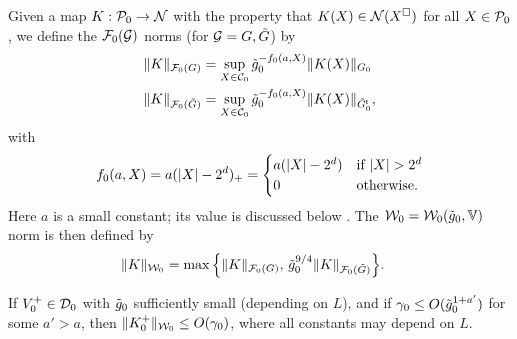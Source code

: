 Given a map $K: \mathcal{P}_0 \rightarrow \mathcal{N}$ with the property that $K(X) \in \mathcal{N}(X^\Box)$
for all $X \in \mathcal{P}_0$,
we define the $\mathcal{F}_0(\mathcal{G})$ norms (for $\mathcal{G} = G, \tilde G$) by
\begin{align}
\|K\|_{\mathcal{F}_0(G)}        &= \sup_{X\in\mathcal{C}_0} \tilde{g}_0^{-f_0(a, X)} \|K(X)\|_{G_0} \\
\|K\|_{\mathcal{F}_0(\tilde G)} &= \sup_{X\in\mathcal{C}_0}
\tilde{g}_0^{-f_0(a, X)} \|K(X)\|_{\tilde G_0^{\sf t}},
\end{align}
with
\begin{equation}
    \label{e:f0def}
    f_0 (a, X)
    =
    a (|X|-2^d)_+
    =
    \begin{cases}
    a (|X| - 2^d)
    & \text{if } |X| > 2^d   \\
    0
    & \text{otherwise}.
    \end{cases}
\end{equation}
Here $a$ is a small constant;  its value is discussed below \cite[\eqref{step-e:T0dom}]{BS-rg-step}.
The $\mathcal{W}_0 = \mathcal{W}_0(\tilde{g}_0, \mathbb{V})$ norm is then defined by
\begin{align}
\label{e:9Kcalnorm}
\|K\|_{\mathcal{W}_0}
  &=
  \max
  \Big\{
  \|K \|_{\mathcal{F}_0(G)},\,
  \tilde{g}_0^{9/4}
  \|K \|_{\mathcal{F}_0(\tilde{G})}
  \Big\}.
\end{align}

\begin{prop}
\label{prop:KWcal}
If $V_0^+ \in \mathcal{D}_0$ with $\tilde{g}_0$ sufficiently small
(depending on $L$), and if $\gamma_0 \le O(\tilde{g}_0^{1+a'})$
for some $a' >a$,
then $\|K_0^+\|_{\mathcal{W}_0} \le O(\gamma_0)$,
where all constants may depend on $L$.
\end{prop}

